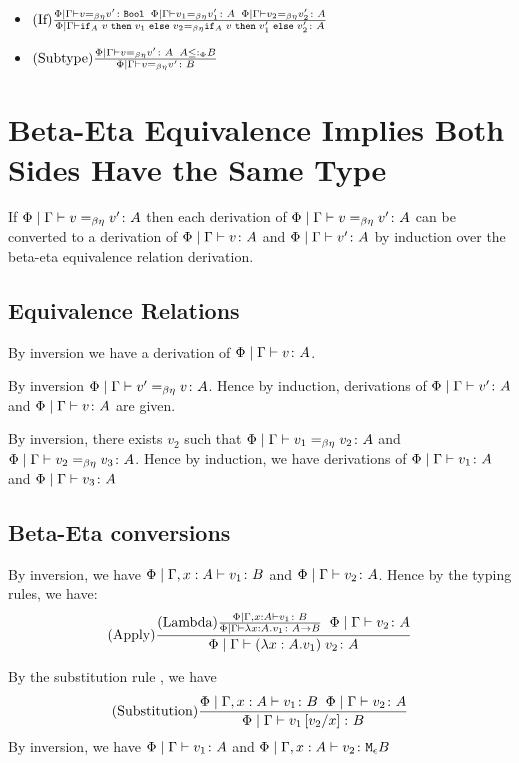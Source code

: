 {\begin{itemize}
        \item $\treerule{If}{\gpeberelation{v}{v'}{\B} \s\s \gpeberelation{v_1}{v_1'}{A}\s\s\gpeberelation{v_2}{v_2'}{A}}{\gpeberelation{\pifthenelse{A}{v}{v_1}{v_2}}{\pifthenelse{A}{v}{v_1'}{v_2'}}{A}}$
        \item $\treerule{Subtype}{\gpeberelation{v}{v'}{A} \s\s A \subtypep B}{\gpeberelation{v}{v'}{B}}$
    \end{itemize}

\section{Beta-Eta Equivalence Implies Both Sides Have the Same Type}

    If $\gpeberelation{v}{v'}{A}$ then each derivation of $\gpeberelation{v}{v'}{A}$ can be converted to a derivation of $\gpetyperelation{v}{A}$ and $\gpetyperelation{v'}{A}$ by induction over the beta-eta equivalence relation derivation.

    \subsection{Equivalence Relations}
    By inversion we have a derivation of $\gpetyperelation{v}{A}$.

    By inversion $\gpeberelation{v'}{v}{A}$. Hence by induction, derivations of $\gpetyperelation{v'}{A}$ and $\gpetyperelation{v}{A}$ are given.

    By inversion, there exists $v_2$ such that $\gpeberelation{v_1}{v_2}{A}$ and $\gpeberelation{v_2}{v_3}{A}$. Hence by induction, we have derivations of $\gpetyperelation{v_1}{A}$ and $\gpetyperelation{v_3}{A}$

    \subsection{Beta-Eta conversions}
    
        By inversion, we have $\etyperelation{\P}{\gax}{v_1}{B}$ and $\gpetyperelation{v_2}{A}$. Hence by the typing rules, we have:
        $$\treerule{Apply}{
            \treerule{Lambda}{\etyperelation{\P}{\gax }{v_1}{B}}{\gpetyperelation{\lam{x}{A}{v_1}}{\ab}}
            \s\s
            \gpetyperelation{v_2}{A}
        }{\gpetyperelation{\apply{(\lam{x}{A}{v_1})}{v_2}}{A}}$$

        By the substitution rule , we have 
        $$\treerule{Substitution}{\etyperelation{\P}{\gax}{v_1}{B}\s\s\gpetyperelation{v_2}{A}}{\gpetyperelation{v_1\ssub{x}{v_2}}{B}}$$
        By inversion, we have $\gpetyperelation{v_1}{A}$ and $\etyperelation{\P}{\gax }{v_2}{\meb}$

}
